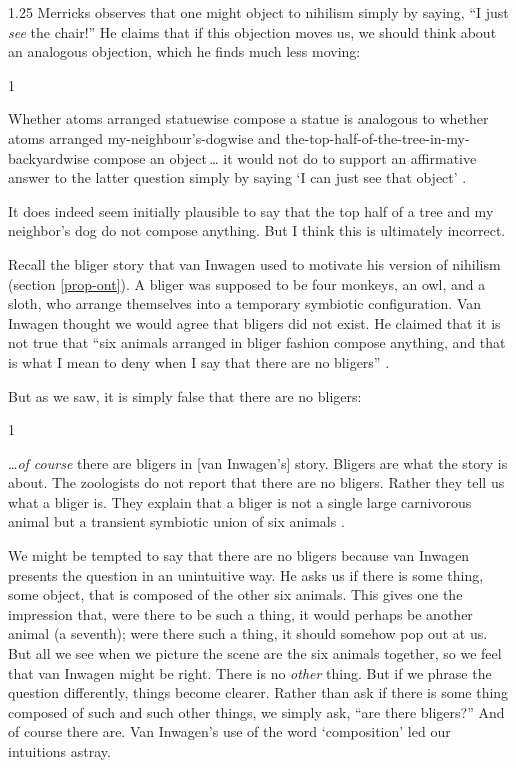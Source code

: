 \documentclass[11pt]{article}
\newenvironment{squote}{%
\begin{spacing}{1}
       	\begin{list}{}{%
\setlength{\labelwidth}{0pt}%
\rightmargin\leftmargin%
}
\item\relax
}{%
\end{list}%
\end{spacing}
}
\begin{document}
\begin{spacing}{1.25}
Merricks observes that one might object to nihilism simply by saying,
``I just {\em see} the chair!''  He claims that if this objection
moves us, we should think about an analogous objection, which he finds
much less moving:

\begin{squote}
Whether atoms arranged statuewise compose a statue is analogous to
whether atoms arranged my-neighbour's-dogwise and
the-top-half-of-the-tree-in-my-backyardwise compose an object\,\ldots
it would not do to support an affirmative answer to the latter
question simply by saying `I can just see that object'
\citeyearpar[73]{merricks2001a}.
\end{squote}

It does indeed seem initially plausible to say that the top half of a
tree and my neighbor's dog do not compose anything.  But I think this
is ultimately incorrect.

Recall the bliger story that van Inwagen used to motivate his version
of nihilism (section \ref{prop-ont}).  A bliger was supposed to be
four monkeys, an owl, and a sloth, who arrange themselves into a
temporary symbiotic configuration.  Van Inwagen thought we would agree
that bligers did not exist.  He claimed that it is not true that ``six
animals arranged in bliger fashion compose anything, and that is what
I mean to deny when I say that there are no bligers''
\citeyearpar[104]{inwagen1995}.

But as we saw, it is simply false that there are no bligers:

\begin{squote}
\ldots {\em of course} there are bligers in [van Inwagen's] story.
Bligers are what the story is about.  The zoologists do not report
that there are no bligers.  Rather they tell us what a bliger is.
They explain that a bliger is not a single large carnivorous animal
but a transient symbiotic union of six animals
\citep[704]{rosenberg1993}.
\end{squote}

We might be tempted to say that there are no bligers because van
Inwagen presents the question in an unintuitive way.  He asks us if
there is some thing, some object, that is composed of the other six
animals.  This gives one the impression that, were there to be such a
thing, it would perhaps be another animal (a seventh); were there such
a thing, it should somehow pop out at us.  But all we see when we
picture the scene are the six animals together, so we feel that van
Inwagen might be right.  There is no {\em other} thing.  But if we
phrase the question differently, things become clearer.  Rather than
ask if there is some thing composed of such and such other things, we
simply ask, ``are there bligers?''  And of course there are.  Van
Inwagen's use of the word `composition' led our intuitions astray.


\end{spacing}
\end{document}
